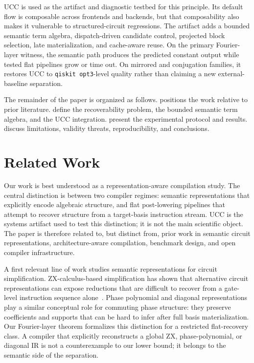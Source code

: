 \documentclass[11pt]{article}
\begin{document}
UCC is used as the artifact and diagnostic testbed for this principle. Its
default flow is composable across frontends and backends, but that
composability also makes it vulnerable to structured-circuit regressions. The
artifact adds a bounded semantic term algebra, dispatch-driven candidate
control, projected block selection, late materialization, and cache-aware
reuse. On the primary Fourier-layer witness, the semantic path produces the
predicted constant output while tested flat pipelines grow or time out. On
mirrored and conjugation families, it restores UCC to \texttt{qiskit opt3}-level
quality rather than claiming a new external-baseline separation.

The remainder of the paper is organized as follows.
 positions the work relative to prior literature.
 define the recoverability
problem, the bounded semantic term algebra, and the UCC integration.
 present the experimental protocol
and results. 
discuss limitations, validity threats, reproducibility, and conclusions.

\section{Related Work}
\label{sec:related}

Our work is best understood as a representation-aware compilation study. The
central distinction is between two compiler regimes: semantic representations
that explicitly encode algebraic structure, and flat post-lowering pipelines
that attempt to recover structure from a target-basis instruction stream. UCC
is the systems artifact used to test this distinction; it is not the main
scientific object. The paper is therefore related to, but distinct from, prior
work in semantic circuit representations, architecture-aware compilation,
benchmark design, and open compiler infrastructure.

A first relevant line of work studies semantic representations for circuit
simplification. ZX-calculus-based simplification has shown that alternative
circuit representations can expose reductions that are difficult to recover
from a gate-level instruction sequence alone~\cite{duncan2020zx}. Phase
polynomial and diagonal representations play a similar conceptual role for
commuting phase structure: they preserve coefficients and supports that can be
hard to infer after full basis materialization. Our Fourier-layer theorem
formalizes this distinction for a restricted flat-recovery class. A compiler
that explicitly reconstructs a global ZX, phase-polynomial, or diagonal IR is
not a counterexample to our lower bound; it belongs to the semantic side of the
separation.
\end{document}
